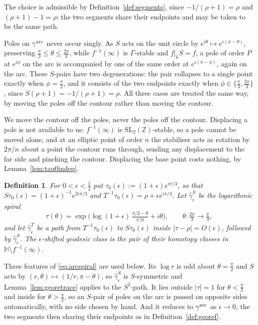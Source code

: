 \documentclass[11pt]{article}
\newtheorem{definition}[theorem]{Definition}
\newcommand{\HH}{\mathbb{H}}
\newcommand{\ZZ}{\mathbb{Z}}
\newcommand{\SLZ}{\mathrm{SL}_2(\ZZ)}
\begin{document}
The choice is admissible by Definition~\ref{def:segments}, since $-1/(\rho+1)=\rho$ and
$(\rho+1)-1=\rho$: the two segments share their endpoints and may be taken to be the same path.

Poles on $\gamma^{\rm arc}$ never occur singly. As $S$ acts on the unit circle by
$e^{i\theta}\mapsto e^{i(\pi-\theta)}$, preserving $\tfrac{\pi}{3}\le\theta\le\tfrac{2\pi}{3}$,
while $f^{-1}(\infty)$ is $\Gamma$-stable and $f|_kS=f$, a pole of order $P$ at $e^{i\phi}$ on the
arc is accompanied by one of the same order at $e^{i(\pi-\phi)}$, again on the arc. These $S$-pairs
have two degenerations: the pair collapses to a single point exactly when $\phi=\tfrac{\pi}{2}$,
and it consists of the two endpoints exactly when $\phi\in\{\tfrac{\pi}{3},\tfrac{2\pi}{3}\}$,
since $S(\rho+1)=-1/(\rho+1)=\rho$. All three cases are treated the same way, by moving the poles
off the contour rather than moving the contour.

We move the contour off the poles, never the poles off the contour. Displacing a pole is not
available to us: $f^{-1}(\infty)$ is $\SLZ$-stable, so a pole cannot be moved alone, and at an
elliptic point of order $n$ the stabiliser acts as rotation by $2\pi/n$ about a point the contour
runs through, sending any displacement to the far side and pinching the contour. Displacing the
base point costs nothing, by Lemma~\ref{lem:tau0indep}.

\begin{definition}\label{def:arcshift}
For $0<\epsilon<\tfrac12$ put $\tau_0(\epsilon):=(1+\epsilon)e^{i\pi/3}$, so that
$S\tau_0(\epsilon)=(1+\epsilon)^{-1}e^{2i\pi/3}$ and $T^{-1}\tau_0(\epsilon)=\rho+\epsilon
e^{i\pi/3}$. Let $\hat\gamma^S_\epsilon$ be the logarithmic spiral
\begin{equation}\label{eq:arcspiral}
\tau(\theta)=\exp\Big(\log(1+\epsilon)\,\tfrac{\pi/2-\theta}{\pi/6}+i\theta\Big),
\qquad \theta:\tfrac{2\pi}{3}\to\tfrac{\pi}{3},
\end{equation}
and let $\hat\gamma^T_\epsilon$ be a path from $T^{-1}\tau_0(\epsilon)$ to $S\tau_0(\epsilon)$
inside $|\tau-\rho|=O(\epsilon)$, followed by $\hat\gamma^S_\epsilon$. The
\emph{$\epsilon$-shifted geodesic class} is the pair of their homotopy classes in
$\HH\setminus f^{-1}(\infty)$.
\end{definition}

Three features of \eqref{eq:arcspiral} are used below. Its $\log r$ is odd about
$\theta=\tfrac{\pi}{2}$ and $S$ acts by $(r,\theta)\mapsto(1/r,\pi-\theta)$, so
$\hat\gamma^S_\epsilon$ is $S$-symmetric and Lemma~\ref{lem:georetrace} applies to the
$S^2$-path. It lies outside $|\tau|=1$ for $\theta<\tfrac{\pi}{2}$ and inside for
$\theta>\tfrac{\pi}{2}$, so an $S$-pair of poles on the arc is passed on opposite sides
automatically, with no side chosen by hand. And it reduces to $\gamma^{\rm arc}$ as
$\epsilon\to0$, the two segments then sharing their endpoints as in
Definition~\ref{def:georef}.
\end{document}
